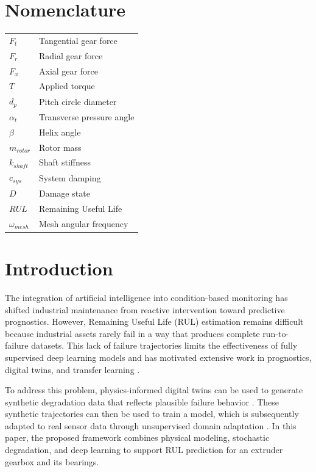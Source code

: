 \documentclass[journal,10pt,a4paper]{IEEEtran}
\begin{document}
\section*{Nomenclature}
\noindent
\begin{tabularx}{\columnwidth}{L{1.5cm} Y}
$F_t$ & Tangential gear force \\
$F_r$ & Radial gear force \\
$F_x$ & Axial gear force \\
$T$ & Applied torque \\
$d_p$ & Pitch circle diameter \\
$\alpha_t$ & Transverse pressure angle \\
$\beta$ & Helix angle \\
$m_{rotor}$ & Rotor mass \\
$k_{shaft}$ & Shaft stiffness \\
$c_{sys}$ & System damping \\
$D$ & Damage state \\
$RUL$ & Remaining Useful Life \\
$\omega_{mesh}$ & Mesh angular frequency \\
\end{tabularx}
\vspace{1em}

\section{Introduction}
The integration of artificial intelligence into condition-based monitoring has shifted industrial maintenance from reactive intervention toward predictive prognostics. However, Remaining Useful Life (RUL) estimation remains difficult because industrial assets rarely fail in a way that produces complete run-to-failure datasets. This lack of failure trajectories limits the effectiveness of fully supervised deep learning models and has motivated extensive work in prognostics, digital twins, and transfer learning \cite{goodfellow2016deep,wang2021survey,tao2018digitaltwin,uda_benchmark_ieee}.

To address this problem, physics-informed digital twins can be used to generate synthetic degradation data that reflects plausible failure behavior \cite{tao2018digitaltwin,grieves2014digitaltwin,dt_bearing_semantic,dt_rul_mdpi}. These synthetic trajectories can then be used to train a model, which is subsequently adapted to real sensor data through unsupervised domain adaptation \cite{ganin2016domain,uda_phm,uda_bearing_pmc}. In this paper, the proposed framework combines physical modeling, stochastic degradation, and deep learning to support RUL prediction for an extruder gearbox and its bearings.
\end{document}
